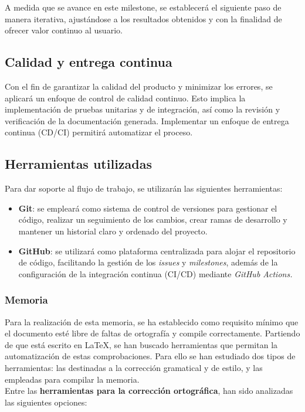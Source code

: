 A medida que se avance en este milestone, se establecerá el siguiente paso de manera iterativa,
ajustándose a los resultados obtenidos y con la finalidad de ofrecer valor continuo al usuario.

\subsection{Calidad y entrega continua}
Con el fin de garantizar la calidad del producto y minimizar los errores, se aplicará
un enfoque de control de calidad continuo. Esto implica la implementación de pruebas unitarias
y de integración, así como la revisión y verificación de la documentación generada.
Implementar un enfoque de entrega continua (CD/CI) permitirá automatizar el proceso.


\subsection{Herramientas utilizadas}
Para dar soporte al flujo de trabajo, se utilizarán las siguientes herramientas:
\begin{itemize}
    \item \textbf{Git}: se empleará como sistema de control de versiones para gestionar el código,
    realizar un seguimiento de los cambios, crear ramas de desarrollo y mantener un historial
    claro y ordenado del proyecto.
    \item \textbf{GitHub}: se utilizará como plataforma centralizada para alojar el repositorio
    de código, facilitando la gestión de los \textit{issues} y \textit{milestones}, además de la
    configuración de la integración continua (CI/CD) mediante \textit{GitHub Actions.}
\end{itemize}

\subsubsection{Memoria}
Para la realización de esta memoria, se ha establecido como requisito mínimo que
el documento esté libre de faltas de ortografía y compile correctamente. Partiendo de que 
está escrito en \LaTeX, se han buscado herramientas que permitan la automatización de estas 
comprobaciones. Para ello se han estudiado dos tipos de herramientas: las destinadas a la
corrección gramatical y de estilo, y las empleadas para compilar la memoria.
\\

Entre las \textbf{herramientas para la corrección ortográfica}, han sido analizadas las siguientes
opciones:

